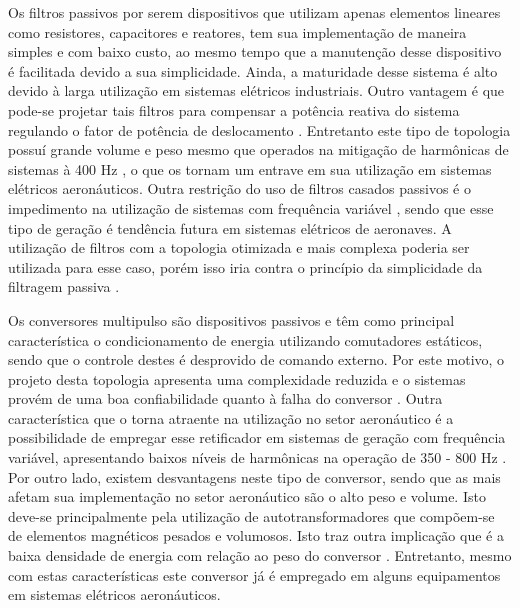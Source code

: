Os filtros passivos por serem dispositivos que utilizam apenas elementos lineares como resistores, capacitores e reatores, tem sua implementação de maneira simples e com baixo custo, ao mesmo tempo que a manutenção desse dispositivo é facilitada devido a sua simplicidade. Ainda, a maturidade desse sistema é alto devido à larga utilização em sistemas elétricos industriais. Outro vantagem é que pode-se projetar tais filtros para compensar a potência reativa do sistema regulando o fator de potência de deslocamento \cite{Zhu2014}. Entretanto este tipo de topologia possuí grande volume e peso mesmo que operados na mitigação de harmônicas de sistemas à 400 Hz \cite{Barruel2004}, o que os tornam um entrave em sua utilização em sistemas elétricos aeronáuticos. Outra restrição do uso de filtros casados passivos é o impedimento na utilização de sistemas com frequência variável \cite{Barruel2004, Chen2012}, sendo que esse tipo de geração é tendência futura em sistemas elétricos de aeronaves. A utilização de filtros com a topologia otimizada e mais complexa poderia ser utilizada para esse caso, porém isso iria contra o princípio da simplicidade da filtragem passiva \cite{Barruel2004}.   
 
Os conversores multipulso são dispositivos passivos e têm como principal característica o condicionamento de energia utilizando comutadores estáticos, sendo que o controle destes é desprovido de comando externo. Por este motivo, o projeto desta topologia apresenta uma complexidade reduzida e o sistemas provém de uma boa confiabilidade quanto à falha do conversor \cite{Gong2003, Lobo2005}. Outra característica que o torna atraente na utilização no setor aeronáutico é a possibilidade de empregar esse retificador em sistemas de geração com frequência variável, apresentando baixos níveis de harmônicas na operação de 350 - 800 Hz \cite{Gong2003, Lobo2005}. Por outro lado, existem desvantagens neste tipo de conversor, sendo que as mais afetam sua implementação no setor aeronáutico são o alto peso e volume. Isto deve-se principalmente pela utilização de autotransformadores que compõem-se de elementos magnéticos pesados e volumosos. Isto traz outra implicação que é a baixa densidade de energia com relação ao peso do conversor \cite{Zhu2014}. Entretanto, mesmo com estas características este conversor já é empregado em alguns equipamentos em sistemas elétricos aeronáuticos.

